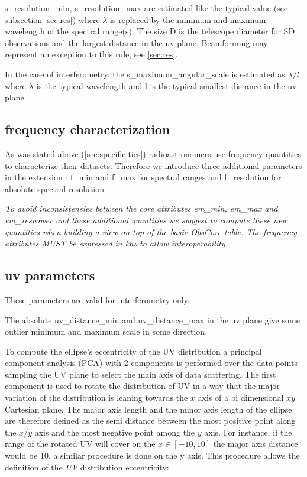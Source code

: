\documentclass[11pt,a4paper]{ivoa}
\begin{document}
s\_resolution\_min, s\_resolution\_max are estimated like the typical value (see subsection \ref{sec:res}) where $\lambda$ is replaced by the minimum and maximum wavelength of the spectral range(s). The size D is the telescope diameter for SD observations and the largest distance in the uv plane. Beamforming may represent an exception to this rule, see \ref{sec:res}.

In the case of interferometry, the s\_maximum\_angular\_scale is estimated as $\lambda/l$ where $\lambda$ is the typical
wavelength and l is the typical smallest distance in the uv plane.

\subsection{frequency characterization}

As was stated above (\ref{sec:specificities}) radioastronomers use frequency quantities to characterize their datasets. Therefore we introduce three additional parameters in the extension : f\_min and f\_max for spectral ranges and f\_resolution for absolute spectral resolution .

\textit{To avoid inconsistensies between the core attributes em\_min, em\_max and em\_respower and these additional quantities we suggest to compute these new quantities when building a view on top of the basic ObsCore table. The frequency attributes MUST be expressed in khz to allow interoperability.}
\subsection{uv parameters}
These parameters are valid for interferometry only.

The absolute uv\_distance\_min and uv\_distance\_max  in the uv plane give some outlier minimum and maximum scale in some direction.

To compute the ellipse's eccentricity of the UV distribution a principal component analysis
(PCA) with 2 components is performed over the data points sampling the UV plane to select the
main axis of data scattering.
The first component is used to rotate the distribution of UV in a way that the major variation
of the distribution is leaning towards the $x$ axis of a bi dimensional $xy$ Cartesian plane.
The major axis length and the minor axis length of the ellipse are therefore defined as the
semi distance between the most positive point along the $x$/$y$ axis and the most negative point
among the $y$ axis. For instance, if the range of the rotated UV will cover on the $x \in [-10,
10]$ the major axis distance would be 10, a similar procedure is done on the y axis. This
procedure allows the definition of the \emph{UV} distribution eccentricity:
\end{document}
